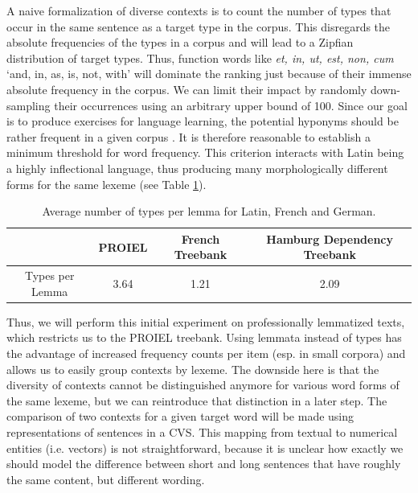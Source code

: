\documentclass[runningheads]{llncs}
\begin{document}
A naive formalization of diverse contexts is to count the number of types that occur in the same sentence as a target type in the corpus. This disregards the absolute frequencies of the types in a corpus and will lead to a Zipfian distribution \parencite[VI]{zipfPsychobiologyLanguageIntroduction1936} of target types. Thus, function words like \textit{et, in, ut, est, non, cum} `and, in, as, is, not, with' will dominate the ranking just because of their immense absolute frequency in the corpus. We can limit their impact by randomly down-sampling their occurrences using an arbitrary upper bound of 100. Since our goal is to produce exercises for language learning, the potential hyponyms should be rather frequent in a given corpus \parencites[27]{ellisUsagebasedLanguageInvestigating2013}[2]{robillardMonolingualBilingualChildren2014}. It is therefore reasonable to establish a minimum threshold for word frequency. This criterion interacts with Latin being a highly inflectional language, thus producing many morphologically different forms for the same lexeme (see Table \ref{tableTypesPerLemma}).
\begin{table}[ht]
	\begin{tabular}{ c | c | c | c }
  		 & PROIEL & French Treebank & Hamburg Dependency Treebank \\ \hline
  		Types per Lemma & 3.64 & 1.21 & 2.09 \\
	\end{tabular}
	\caption{Average number of types per lemma for Latin, French and German.}
	\label{tableTypesPerLemma}
\end{table}

Thus, we will perform this initial experiment on professionally lemmatized texts, which restricts us to the PROIEL treebank. Using lemmata instead of types has the advantage of increased frequency counts per item (esp. in small corpora) and allows us to easily group contexts by lexeme. The downside here is that the diversity of contexts cannot be distinguished anymore for various word forms of the same lexeme, but we can reintroduce that distinction in a later step. The comparison of two contexts for a given target word will be made using representations of sentences in a \gls{CVS}. This mapping from textual to numerical entities (i.e. vectors) is not straightforward, because it is unclear how exactly we should model the difference between short and long sentences that have roughly the same content, but different wording. 
\end{document}

